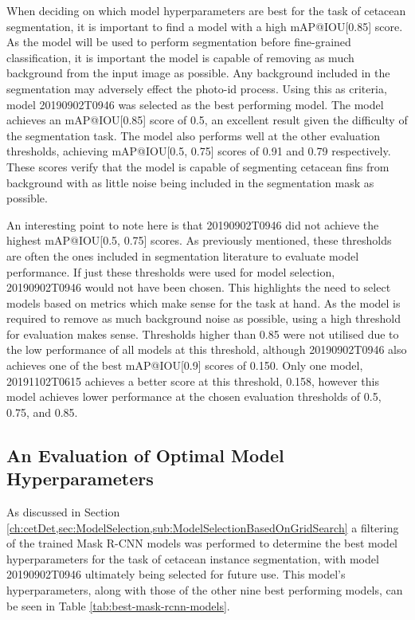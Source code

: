When deciding on which model hyperparameters are best for the task of cetacean segmentation, it is important to find a model with a high mAP@IOU[0.85] score. As the model will be used to perform segmentation before fine-grained classification, it is important the model is capable of removing as much background from the input image as possible. Any background included in the segmentation may adversely effect the photo-id process. Using this as criteria, model 20190902T0946 was selected as the best performing model. The model achieves an mAP@IOU[0.85] score of 0.5, an excellent result given the difficulty of the segmentation task. The model also performs well at the other evaluation thresholds, achieving mAP@IOU[0.5, 0.75] scores of 0.91 and 0.79 respectively. These scores verify that the model is capable of segmenting cetacean fins from background with as little noise being included in the segmentation mask as possible.

An interesting point to note here is that 20190902T0946 did not achieve the highest mAP@IOU[0.5, 0.75] scores. As previously mentioned, these thresholds are often the ones included in segmentation literature to evaluate model performance. If just these thresholds were used for model selection, 20190902T0946 would not have been chosen. This highlights the need to select models based on metrics which make sense for the task at hand. As the model is required to remove as much background noise as possible, using a high threshold for evaluation makes sense. Thresholds higher than 0.85 were not utilised due to the low performance of all models at this threshold, although 20190902T0946 also achieves one of the best mAP@IOU[0.9] scores of 0.150. Only one model, 20191102T0615 achieves a better score at this threshold, 0.158, however this model achieves lower performance at the chosen evaluation thresholds of 0.5, 0.75, and 0.85.

\subsection{An Evaluation of Optimal Model Hyperparameters}\label{ch:cetDet,sec:ModelSelection,sub:OptimalHyperparameters}

As discussed in Section \ref{ch:cetDet,sec:ModelSelection,sub:ModelSelectionBasedOnGridSearch} a filtering of the trained Mask R-CNN models was performed to determine the best model hyperparameters for the task of cetacean instance segmentation, with model 20190902T0946 ultimately being selected for future use. This model's hyperparameters, along with those of the other nine best performing models, can be seen in Table \ref{tab:best-mask-rcnn-models}.

